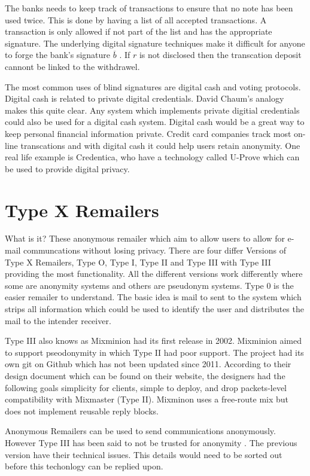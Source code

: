 \documentclass[12pt]{article}
\begin{document}
The banks needs to keep track of transactions to ensure that no note has been used twice. This is done by having a list of all accepted transactions. A transaction is only allowed if not part of the list and has the appropriate signature. The underlying digital signature techniques make it difficult for anyone to forge the bank's signature $\overline{b}$ \cite{Chaum}. If $r$ is not disclosed then the transcation deposit cannont be linked to the withdrawel.

The most common uses of blind signatures are digital cash and voting protocols. Digital cash is related to private digital credentials. David Chaum's analogy makes this quite clear. Any system which implements private digitial credentials could also be used for a digital cash system. Digital cash would be a great way to keep personal financial information private. Credit card companies track most on-line transcations and with digital cash it could help users retain anonymity. One real life example is Credentica, who have a technology called U-Prove which can be used to provide digital privacy.

\section{Type X Remailers}\label{sec:type-x}
What is it?
These anonymous remailer which aim to allow users to allow for e-mail communcations without losing privacy. There are four differ Versions of Type X Remailers, Type O, Type I, Type II and Type III with Type III providing the most functionality. All the different versions work differently where some are anonymity systems and others are pseudonym systems. Type 0 is the easier remailer to understand. The basic idea is mail to sent to the system which strips all information which could be used to identify the user and distributes the mail to the intender receiver.

Type III also knows as Mixminion had its first  release in 2002. Mixminion aimed to support pseodonymity in which Type II had poor support\cite{GoldbertTwo}. The project had its own git on Github which has not been updated since 2011. According to their design document which can be found on their website, the designers had the following goals simplicity for clients, simple to deploy, and drop packets-level compatibility with Mixmaster (Type II).  Mixminon uses a free-route mix but does not implement reusable reply blocks.

Anonymous Remailers can be used to send communications anonymously. However Type III  has been said to not be trusted for anonymity \cite{GoldbertTwo}. The previous version have their technical issues. This details would need to be sorted out before this techonlogy can be replied upon.
\end{document}
